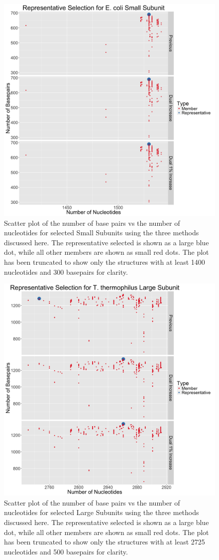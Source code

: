 \begin{figure}
  \includegraphics[width=0.5\linewidth]{chapter-4/figs/ec-ssu-rep}
  \caption{Scatter plot of the number of base pairs vs the number of nucleotides
    for selected \EC{} Small Subunits using the three methods discussed here.
    The representative selected is shown as a large blue dot, while all other
    members are shown as small red dots. The plot has been truncated to show
    only the structures with at least 1400 nucleotides and 300 basepairs for
  clarity.}
  \label{fig:ec-ssu-rep}
\end{figure}

\begin{figure}
  \includegraphics[width=0.5\linewidth]{chapter-4/figs/tt-lsu-rep}
  \caption{Scatter plot of the number of base pairs vs the number of nucleotides
    for selected \TT{} Large Subunits using the three methods
    discussed here. The representative selected is shown as a large blue dot,
    while all other members are shown as small red dots. The plot has been
    truncated to show only the structures with at least 2725 nucleotides and 500
  basepairs for clarity.}
  \label{fig:tt-lsu-rep}
\end{figure}

